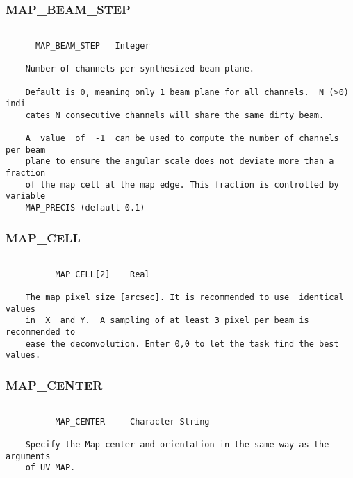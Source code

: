 \subsubsection{MAP\_BEAM\_STEP}
\begin{verbatim}

      MAP_BEAM_STEP   Integer

    Number of channels per synthesized beam plane.

    Default is 0, meaning only 1 beam plane for all channels.  N (>0)  indi-
    cates N consecutive channels will share the same dirty beam.

    A  value  of  -1  can be used to compute the number of channels per beam
    plane to ensure the angular scale does not deviate more than a  fraction
    of the map cell at the map edge. This fraction is controlled by variable
    MAP_PRECIS (default 0.1)

\end{verbatim}
\subsubsection{MAP\_CELL}
\begin{verbatim}

          MAP_CELL[2]    Real

    The map pixel size [arcsec]. It is recommended to use  identical  values
    in  X  and Y.  A sampling of at least 3 pixel per beam is recommended to
    ease the deconvolution. Enter 0,0 to let the task find the best values.

\end{verbatim}
\subsubsection{MAP\_CENTER}
\begin{verbatim}

          MAP_CENTER     Character String

    Specify the Map center and orientation in the same way as the  arguments
    of UV_MAP.

\end{verbatim}
\subsubsection{MAP\_CONVOLUTION}
\begin{verbatim}

        MAP_CONVOLUTION    Integer

    Select the desired convolution function for gridding  in  the  UV  plane
    Choices are
            0    Default (currently 5)
            1    Boxcar
            2    Gaussian
            3    Sin(x)/x
            4    Gaussian * Sin(x)/x
            5    Spheroidal
    Spheroidal functions is the optimal choice. So  we  strongly  discourage
    use of any other convolution function, which are here for tests only.

\end{verbatim}
